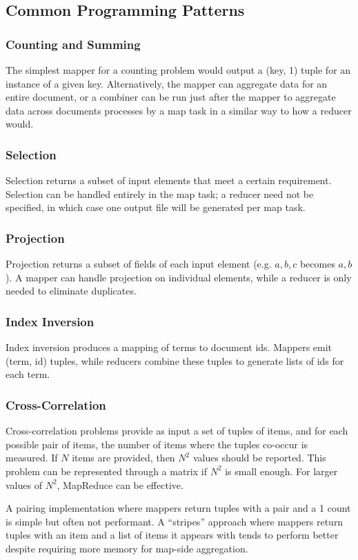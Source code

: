 \documentclass[12pt,titlepage]{article}
\begin{document}
    \subsection{Common Programming Patterns}

      \subsubsection{Counting and Summing}
        The simplest mapper for a counting problem would output a (key, 1) tuple for an instance of a given key. Alternatively, the mapper can aggregate data for an
        entire document, or a combiner can be run just after the mapper to aggregate data across documents processes by a map task in a similar way to how a reducer
        would.

      \subsubsection{Selection}
        Selection returns a subset of input elements that meet a certain requirement. Selection can be handled entirely in the map task; a reducer need not be
        specified, in which case one output file will be generated per map task.

      \subsubsection{Projection}
        Projection returns a subset of fields of each input element (e.g. $a,b,c$ becomes $a,b$). A mapper can handle projection on individual elements, while a
        reducer is only needed to eliminate duplicates.

      \subsubsection{Index Inversion}
        Index inversion produces a mapping of terms to document ids. Mappers emit (term, id) tuples, while reducers combine these tuples to generate lists of ids
        for each term.

      \subsubsection{Cross-Correlation}
        Cross-correlation problems provide as input a set of tuples of items, and for each possible pair of items, the number of items where the tuples co-occur is
        measured. If $N$ items are provided, then $N^2$ values should be reported. This problem can be represented through a matrix if $N^2$ is small enough.
        For larger values of $N^2$, MapReduce can be effective.

        A pairing implementation where mappers return tuples with a pair and a 1 count is simple but often not performant. A ``stripes'' approach where mappers
        return tuples with an item and a list of items it appears with tends to perform better despite requiring more memory for map-side aggregation.
\end{document}

